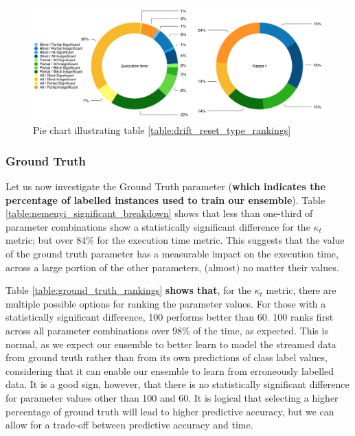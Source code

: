 \begin{figure}
  \includegraphics[width=\linewidth]{./images/chapter5/drift_reset_type_rankings_pie}
\caption{\label{fig:drift_reset_type_rankings_pie}Pie chart illustrating table \ref{table:drift_reset_type_rankings}}
\end{figure}

\subsubsection{Ground Truth}

Let us now investigate the Ground Truth parameter (\textbf{which indicates the percentage of labelled instances used to train our ensemble}). Table \ref{table:nemenyi_significant_breakdown} shows that less than one-third of parameter combinations show a statistically significant difference for the $\kappa_t$ metric; but over $84\%$ for the execution time metric. This suggests that the value of the ground truth parameter has a measurable impact on the execution time, across a large portion of the other parameters, (almost) no matter their values.

Table \ref{table:ground_truth_rankings} \textbf{shows that}, for the $\kappa_t$ metric, there are multiple possible options for ranking the parameter values. For those with a statistically significant difference, 100 performs better than 60. 100 ranks first across all parameter combinations over $98\%$ of the time, as expected. This is normal, as we expect our ensemble to better learn to model the streamed data from ground truth rather than from its own predictions of class label values, considering that it can enable our ensemble to learn from erroneously labelled data. It is a good sign, however, that there is no statistically significant difference for parameter values other than 100 and 60. It is logical that selecting a higher percentage of ground truth will lead to higher predictive accuracy, but we can allow for a trade-off between predictive accuracy and time.

